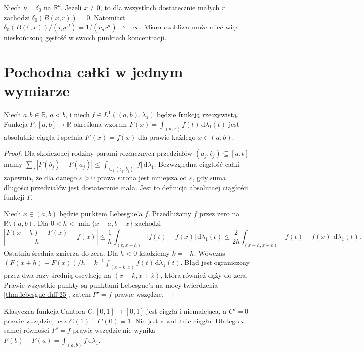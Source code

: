 \begin{przyklad}
Niech $\nu=\delta_0$ na $\mathbb R^d$. Jeżeli $x\ne0$,
to dla wszystkich dostatecznie małych $r$ zachodzi
$\delta_0(B(x,r))=0$. Natomiast
$\delta_0(B(0,r))/(v_dr^d)=1/(v_dr^d)\to+\infty$.
Miara osobliwa może mieć więc nieskończoną gęstość
w swoich punktach koncentracji.
\end{przyklad}

\section{Pochodna całki w jednym wymiarze}
\begin{twierdzenie}
\label{thm:FTC-lebesgue-25}
Niech $a,b\in\mathbb R$, $a<b$, i niech
$f\in L^1((a,b),\lambda_1)$ będzie funkcją rzeczywistą. Funkcja
$F:[a,b]\to\mathbb R$ określona wzorem
$F(x)=\int_{(a,x)}f(t)\,\mathrm d\lambda_1(t)$
jest absolutnie ciągła i spełnia
$F'(x)=f(x)$ dla prawie każdego $x\in(a,b)$.
\end{twierdzenie}
\begin{proof}
Dla skończonej rodziny parami rozłącznych przedziałów
$(a_j,b_j)\subseteq[a,b]$ mamy
$\sum_j|F(b_j)-F(a_j)|
\le\int_{\cup_j(a_j,b_j)}|f|\,\mathrm d\lambda_1$.
Bezwzględna ciągłość całki zapewnia, że dla danego
$\varepsilon>0$ prawa strona jest mniejsza od
$\varepsilon$, gdy suma długości przedziałów jest
dostatecznie mała. Jest to definicja absolutnej
ciągłości funkcji $F$.

Niech $x\in(a,b)$ będzie punktem Lebesgue'a $f$.
Przedłużamy $f$ przez zero na $\mathbb R\setminus(a,b)$.
Dla $0<h<\min\{x-a,b-x\}$ zachodzi
\[
 \left|\frac{F(x+h)-F(x)}h-f(x)\right|
 \le\frac1h\int_{(x,x+h)}|f(t)-f(x)|\,
 \mathrm d\lambda_1(t)
 \le\frac2{2h}\int_{(x-h,x+h)}|f(t)-f(x)|\,
 \mathrm d\lambda_1(t).
\]
Ostatnia średnia zmierza do zera.
Dla $h<0$ kładziemy $k=-h$. Wówczas
$(F(x+h)-F(x))/h=k^{-1}\int_{(x-k,x)}f(t)\,\mathrm d\lambda_1(t)$.
Błąd jest ograniczony przez dwa razy średnią oscylację
na $(x-k,x+k)$, która również dąży do zera.
Prawie wszystkie punkty są
punktami Lebesgue'a na mocy twierdzenia
\ref{thm:lebesgue-diff-25}, zatem $F'=f$ prawie
wszędzie.
\end{proof}

\begin{przyklad}
Klasyczna funkcja Cantora $C:[0,1]\to[0,1]$ jest
ciągła i niemalejąca, a $C'=0$ prawie wszędzie, lecz
$C(1)-C(0)=1$. Nie jest absolutnie ciągła.
Dlatego z samej równości $F'=f$ prawie wszędzie nie
wynika $F(b)-F(a)=\int_{(a,b)}f\,\mathrm d\lambda_1$.
\end{przyklad}

